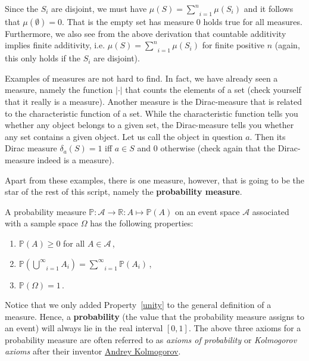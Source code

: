 \documentclass[a4paper,11pt,leqno]{report}
\begin{document}
Since the $ S_{i} $ are disjoint, we
must have $ \mu(S) = \underset{i=1}{\overset{n}{\sum}} \mu (S_{i}) $ and it follows that 
$ \mu(\emptyset) = 0 $.
That is the empty set has measure $ 0 $ holds true for all measures. Furthermore, we also see from the above
derivation that countable additivity implies finite additivity, i.e.
$ \mu(S) = \underset{i=1}{\overset{n}{\sum}} \mu(S_{i}) $ for finite positive $ n $ (again, this only
holds if the $ S_{i} $ are disjoint).

Examples of measures are not hard to find. In fact, we have already seen a measure,
namely the function $ |\cdot| $ that counts the elements of a set (check yourself that it really is a 
measure). Another measure is the Dirac-measure that is related to the characteristic
function of a set. While the characteristic function tells you whether any object belongs to a given set,
the Dirac-measure tells you whether any set contains a given object. Let us call the object in question
$ a $. Then its Dirac measure $ \delta_{a}(S) = 1 $ iff $ a \in S $ and 0 otherwise (check again that the Dirac-measure indeed is a measure).

Apart from these examples, there is one measure, however, that is going to be the star of the rest of this 
script, namely the \textbf{probability measure}.

\begin{Definition}
A probability measure $ \mathbb{P}: \mathcal{A} \rightarrow \mathbb{R} : A \mapsto \mathbb{P}(A) $
on an event space $ \mathcal{A} $ associated with a sample space $ \Omega $ has the
following properties:
\begin{enumerate}
\item $ \mathbb{P}(A) \geq 0 $ for all $ A \in \mathcal{A} \,$,
\item $ \mathbb{P}\left( \underset{i = 1}{\overset{\infty}{\bigcup}} A_{i} \right)
= \underset{i = 1}{\overset{\infty}{\sum}} \mathbb{P} \left( A_{i} \right) \,$, \label{union}
\item $ \mathbb{P}(\Omega) = 1 \,$. \label{unity}
\end{enumerate}
\end{Definition}

Notice that we only added Property~\ref{unity} to the general definition of a measure. Hence, a
\textbf{probability} (the value that the probability measure assigns to an event) will always lie in the real interval 
$[0,1]$. The above three axioms for a probability measure are often referred to as \emph{axioms of probability}
or \emph{Kolmogorov axioms} after their inventor \href{https://en.wikipedia.org/wiki/Andrey_Kolmogorov}{Andrey
Kolmogorov}.
\end{document}

